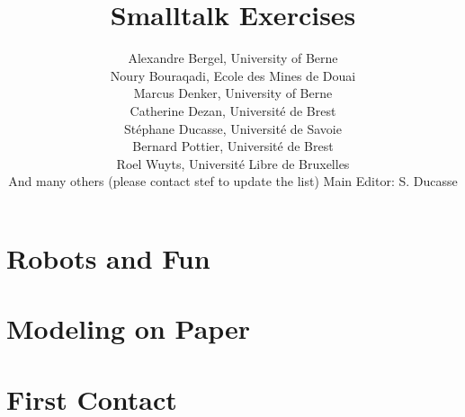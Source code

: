 \let\wholebook=\relax







\title{Smalltalk Exercises}
\author{
Alexandre Bergel, University of Berne\\
Noury Bouraqadi, Ecole des Mines de Douai\\
Marcus Denker, University of Berne \\
Catherine Dezan, Universit\'e de Brest\\
St\'ephane Ducasse, Universit\'e de Savoie\\
Bernard Pottier, Universit\'e de Brest\\
Roel Wuyts, Universit\'e Libre de Bruxelles \\
And many others (please contact stef to update the list)
Main Editor: S. Ducasse}

\maketitle

\tableofcontents

\part{Robots and Fun}


\part{Modeling on Paper}


\part{First Contact}





%
%



